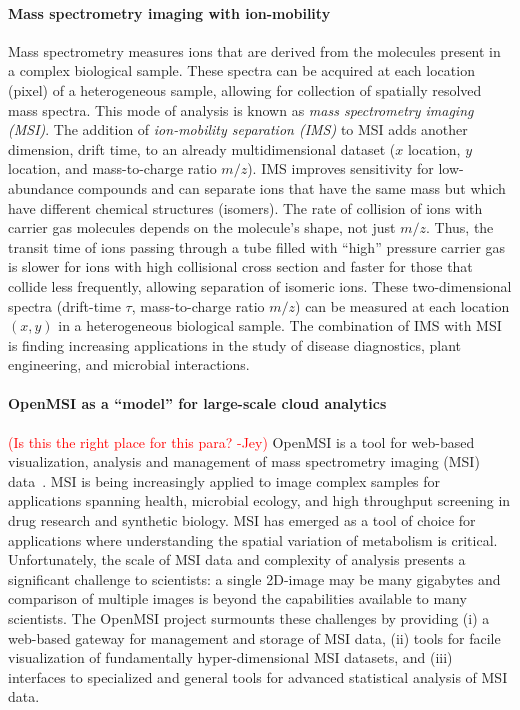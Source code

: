 \paragraph{Mass spectrometry imaging with ion-mobility}
Mass spectrometry measures ions that are derived from the molecules present in a complex biological sample.
These spectra can be acquired at each location (pixel) of a heterogeneous sample, allowing for collection of spatially
resolved mass spectra.
This mode of analysis is known as \textit{mass spectrometry imaging (MSI)}.
The addition of \textit{ion-mobility separation (IMS)} to MSI adds another dimension, drift time, to an already multidimensional
dataset ($x$ location, $y$ location, and mass-to-charge ratio $m/z$).
IMS improves sensitivity for low-abundance compounds and can separate ions that have the same mass but which have
different chemical structures (isomers).
The rate of collision of ions with carrier gas molecules depends on the molecule's shape, not just $m/z$.
Thus, the transit time of ions passing through a tube filled with ``high'' pressure carrier gas is slower
for ions with high collisional cross section and faster for those that collide less frequently, allowing separation of
isomeric ions.
These two-dimensional spectra (drift-time $\tau$, mass-to-charge ratio $m/z$) can be measured at each location $(x, y)$ in a
heterogeneous biological sample.
The combination of IMS with MSI is finding increasing applications in the study of disease diagnostics, plant
engineering, and microbial interactions.

\paragraph{OpenMSI as a ``model'' for large-scale cloud analytics}
\textcolor{red}{(Is this the right place for this para? -Jey)}
OpenMSI is a tool for web-based visualization, analysis and
management of mass spectrometry imaging (MSI) data~\cite{OpenMSI}.  MSI is being increasingly applied to image complex samples for
applications spanning health, microbial ecology, and high throughput screening in drug research and synthetic biology.
MSI has emerged as a tool of choice for applications where understanding the spatial variation of metabolism is
critical. Unfortunately, the scale of MSI data and complexity of analysis presents a significant challenge to
scientists: a single 2D-image may be many gigabytes and comparison of multiple images is beyond the capabilities
available to many scientists. The OpenMSI project surmounts these challenges by providing (i) a web-based gateway for
management and storage of MSI data, (ii) tools for facile visualization of fundamentally hyper-dimensional MSI datasets,
and (iii) interfaces to specialized and general tools for advanced statistical analysis of MSI data.

